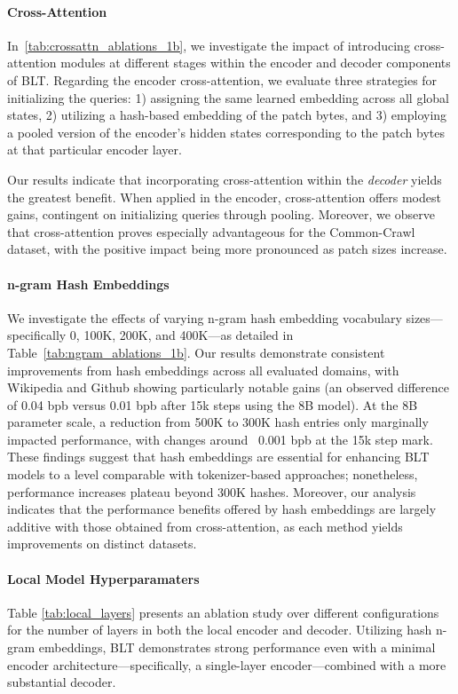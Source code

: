 \paragraph{Cross-Attention} 
In~\autoref{tab:crossattn_ablations_1b}, we investigate the impact of introducing cross-attention modules at different stages within the encoder and decoder components of {\textsc BLT}. Regarding the encoder cross-attention, we evaluate three strategies for initializing the queries: 1) assigning the same learned embedding across all global states, 2) utilizing a hash-based embedding of the patch bytes, and 3) employing a pooled version of the encoder’s hidden states corresponding to the patch bytes at that particular encoder layer.

Our results indicate that incorporating cross-attention within the \textit{decoder} yields the greatest benefit. When applied in the encoder, cross-attention offers modest gains, contingent on initializing queries through pooling. Moreover, we observe that cross-attention proves especially advantageous for the Common-Crawl dataset, with the positive impact being more pronounced as patch sizes increase.

\paragraph{n-gram Hash Embeddings} 

We investigate the effects of varying n-gram hash embedding vocabulary sizes—specifically 0, 100K, 200K, and 400K—as detailed in Table~\ref{tab:ngram_ablations_1b}. Our results demonstrate consistent improvements from hash embeddings across all evaluated domains, with Wikipedia and Github showing particularly notable gains (an observed difference of 0.04 bpb versus 0.01 bpb after 15k steps using the 8B model). At the 8B parameter scale, a reduction from 500K to 300K hash entries only marginally impacted performance, with changes around ~0.001 bpb at the 15k step mark. These findings suggest that hash embeddings are essential for enhancing {\textsc BLT} models to a level comparable with tokenizer-based approaches; nonetheless, performance increases plateau beyond 300K hashes. Moreover, our analysis indicates that the performance benefits offered by hash embeddings are largely additive with those obtained from cross-attention, as each method yields improvements on distinct datasets.

\paragraph{Local Model Hyperparamaters} Table \ref{tab:local_layers} presents an ablation study over different configurations for the number of layers in both the local encoder and decoder. Utilizing hash n-gram embeddings, {\textsc BLT} demonstrates strong performance even with a minimal encoder architecture—specifically, a single-layer encoder—combined with a more substantial decoder.

